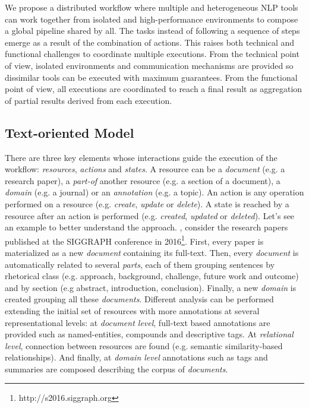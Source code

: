 We propose a distributed workflow where multiple and heterogeneous NLP tools can work together from isolated and high-performance environments to compose a global pipeline shared by all. The tasks instead of following a sequence of steps emerge as a result of the combination of actions. This raises both technical and functional challenges to coordinate multiple executions. From the technical point of view, isolated environments and communication mechanisms are provided so dissimilar tools can be executed with maximum guarantees. From the functional point of view, all executions are coordinated to reach a final result as aggregation of partial results derived from each execution.


\subsection{Text-oriented Model}

There are three key elements whose interactions guide the execution of the workflow: \textit{resources}, \textit{actions} and \textit{states}. A resource can be a \textit{document} (e.g. a research paper), a \textit{part-of} another resource (e.g. a section of a document), a \textit{domain} (e.g. a journal) or an \textit{annotation} (e.g. a topic). An action is any operation performed on a resource (e.g. \textit{create}, \textit{update} or \textit{delete}). A state is reached by a resource after an action is performed (e.g. \textit{created}, \textit{updated} or \textit{deleted}). Let's see an example to better understand the approach. , consider the research papers published at the SIGGRAPH conference in 2016\footnote{http://s2016.siggraph.org}. First, every paper is materialized as a new \textit{document} containing its full-text. Then, every \textit{document} is automatically related to several \textit{parts}, each of them grouping sentences by rhetorical class (e.g. approach, background, challenge, future work and outcome) and by section (e.g abstract, introduction, conclusion). Finally, a new \textit{domain} is created grouping all these \textit{documents}. Different analysis can be performed extending the initial set of resources with more annotations at several representational levels: at \textit{document level}, full-text based annotations are provided such as named-entities, compounds and descriptive tags. At \textit{relational level}, connection between resources are found (e.g. semantic similarity-based relationships). And finally, at \textit{domain level} annotations such as tags and summaries are composed describing the corpus of \textit{documents}.

